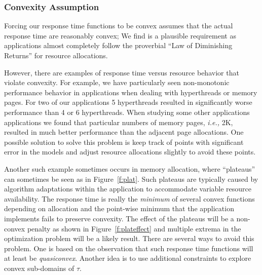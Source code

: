 \subsubsection*{Convexity Assumption}

Forcing our response time functions to be convex assumes that the actual response time are reasonably convex; We find is a plausible requirement as applications almost completely follow the proverbial ``Law of Diminishing Returns'' for resource allocations.

However, there are examples of response time versus resource behavior that violate convexity.   For example, we have particularly seen non-monotonic performance behavior in applications when dealing with hyperthreads or memory pages.  For two of our applications 5 hyperthreads resulted in significantly worse performance than 4 or 6 hyperthreads.  When studying some other applications applications we found that particular numbers of memory pages, \emph{i.e.,} 2K, resulted in much better performance than the adjacent page allocations.  One possible solution to solve this problem is keep track of points with significant error in the models and adjust resource allocations slightly to avoid these points.

Another such example sometimes occurs in memory allocation, where ``plateaus'' can sometimes be seen as in Figure~\ref{f:plat}. Such plateaus are typically caused by algorithm adaptations within the application to accommodate variable resource availability.  The response time is really the \emph{minimum} of several convex functions depending on allocation and the point-wise minimum that the application implements fails to preserve convexity.  The effect of the plateaus will be a non-convex penalty as shown in Figure~\ref{f:plateffect} and multiple extrema in the optimization problem will be a likely result. There are several ways to avoid this problem.  One is based on the observation that such response time functions will at least be \emph{quasiconvex}.  Another idea is to use additional constraints to explore convex sub-domains of $\tau$.

